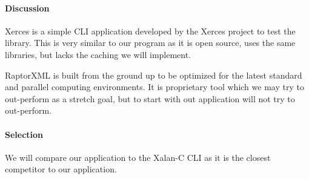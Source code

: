 \paragraph{Discussion}

Xerces is a simple CLI application developed by the Xerces project to test the library.
This is very similar to our program as it is open source, uses the same libraries, but lacks the caching we will implement.

RaptorXML is built from the ground up to be optimized for the latest standard and parallel computing environments.
It is proprietary tool which we may try to out-perform as a stretch goal, but to start with out application will not try to out-perform.

\paragraph{Selection}

We will compare our application to the Xalan-C CLI as it is the closest competitor to our application.
